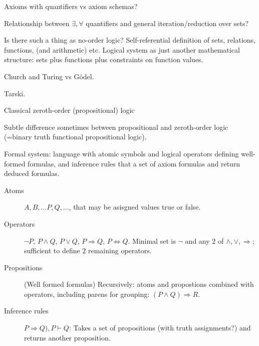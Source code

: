\setcounter{currentlevel}{\value{baseSectionLevel}}
\label{sec:Logic}

\cite{wiki:Logic}

Axioms with quantifiers vs axiom schemas?

Relationship between $\exists, \forall$ quantifiers
and general iteration/reduction over sets?

Is there such a thing as no-order logic?
Self-referential definition of sets, relations, functions,
(and arithmetic) etc. 
Logical system  as just another mathematical structure:
sets plus functions plus constraints on function values.

Church and Turing vs G\"{o}del.

Tarski.

\label{sec:Formal_languages}

\label{sec:Proof_theory}

\label{sec:Model_theory}

\label{sec:Zeroth_order_logic}

Classical zeroth-order (propositional) 
logic~\cite{iep:Propositional_logic,
wiki:Propositional_calculus,
wiki:Zeroth_order_logic}

Subtle difference sometimes between propositional
and zeroth-order logic 
(=binary truth functional propositional logic).

Formal system:
language with atomic symbols
and logical operators defining well-formed formulas,
and inference rules that a set of axiom formulas 
and return deduced formulas.
\begin{description}
\item[Atoms]  $A, B, \ldots P, Q, \ldots$, 
that may be asisgned values \textsf{true} or \textsf{false}.

\item[Operators] $\lnot P$, $P \wedge Q$, $P \vee Q$, 
$P \Rightarrow Q$, $P \Leftrightarrow Q$. 
Minimal set is $\lnot$ and 
any $2$ of  $\wedge, \vee, \Rightarrow$;
sufficient to define $2$ remaining operators.

\item[Propositions] (Well formed formulas)
Recursively: atoms and propostions combined with operators,
including parens for grouping: $(P \wedge Q) \Rightarrow R$.

\item[Inference rules] ${P \Rightarrow Q), P} \vdash Q$:
Takes a set of propositions (with truth assignments?)
and returns another proposition.
\end{description}

